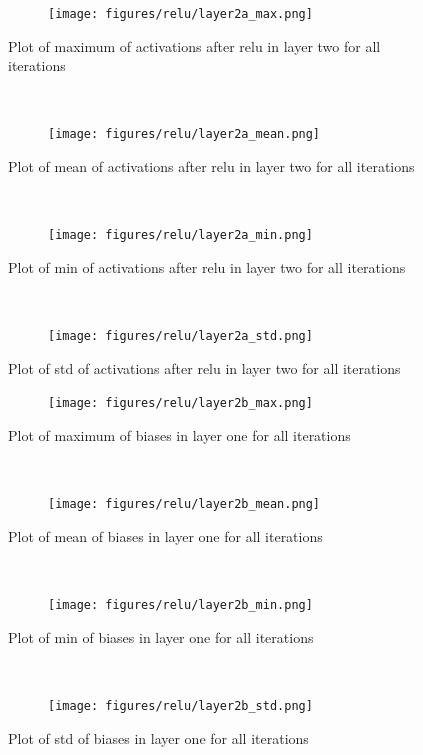 \documentclass[]{article}
\begin{document}
\begin{figure}[ht]
    \centering
    \begin{subfigure}
        \centering
        \texttt{[image: figures/relu/layer2a\_max.png]}
    \end{subfigure}%
    \caption{Plot of maximum of activations after relu in layer two for all iterations}
 \label{fig:/layer2a_max}
    ~ 
    \centering
    \begin{subfigure}
        \centering
        \texttt{[image: figures/relu/layer2a\_mean.png]}
    \end{subfigure}%
    \caption{Plot of mean of activations after relu in layer two for all iterations}
 \label{fig:/layer2a_mean}
    ~ 
    \centering
    \begin{subfigure}
        \centering
        \texttt{[image: figures/relu/layer2a\_min.png]}
    \end{subfigure}%
    \caption{Plot of min of activations after relu in layer two for all iterations}
 \label{fig:/layer2a_min}
    ~ 
    \centering
    \begin{subfigure}
        \centering
        \texttt{[image: figures/relu/layer2a\_std.png]}
    \end{subfigure}%
    \caption{Plot of std of activations after relu in layer two for all iterations}
 \label{fig:/layer2a_std}
\end{figure}



\begin{figure}[ht]
    \centering
    \begin{subfigure}
        \centering
        \texttt{[image: figures/relu/layer2b\_max.png]}
    \end{subfigure}%
    \caption{Plot of maximum of biases in layer one for all iterations}
 \label{fig:/layer2b_max}
    ~ 
    \centering
    \begin{subfigure}
        \centering
        \texttt{[image: figures/relu/layer2b\_mean.png]}
    \end{subfigure}%
    \caption{Plot of mean of biases in layer one for all iterations}
 \label{fig:/layer2b_mean}
    ~ 
    \centering
    \begin{subfigure}
        \centering
        \texttt{[image: figures/relu/layer2b\_min.png]}
    \end{subfigure}%
    \caption{Plot of min of biases in layer one for all iterations}
 \label{fig:/layer2b_min}
    ~ 
    \centering
    \begin{subfigure}
        \centering
        \texttt{[image: figures/relu/layer2b\_std.png]}
    \end{subfigure}%
    \caption{Plot of std of biases in layer one for all iterations}
 \label{fig:/layer2b_std}
\end{figure}
\end{document}
